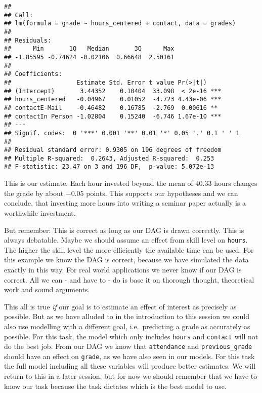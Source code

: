 \documentclass[
]{book}
\begin{document}
\begin{verbatim}
## 
## Call:
## lm(formula = grade ~ hours_centered + contact, data = grades)
## 
## Residuals:
##      Min       1Q   Median       3Q      Max 
## -1.85595 -0.74624 -0.02106  0.66648  2.50161 
## 
## Coefficients:
##                  Estimate Std. Error t value Pr(>|t|)    
## (Intercept)       3.44352    0.10404  33.098  < 2e-16 ***
## hours_centered   -0.04967    0.01052  -4.723 4.43e-06 ***
## contactE-Mail    -0.46482    0.16785  -2.769  0.00616 ** 
## contactIn Person -1.02804    0.15240  -6.746 1.67e-10 ***
## ---
## Signif. codes:  0 '***' 0.001 '**' 0.01 '*' 0.05 '.' 0.1 ' ' 1
## 
## Residual standard error: 0.9305 on 196 degrees of freedom
## Multiple R-squared:  0.2643, Adjusted R-squared:  0.253 
## F-statistic: 23.47 on 3 and 196 DF,  p-value: 5.072e-13
\end{verbatim}

This is our estimate. Each hour invested beyond the mean of \(40.33\) hours
changes the grade by about \(-0.05\) points. This supports our hypotheses and we
can conclude, that investing more hours into writing a seminar paper actually
is a worthwhile investment.

But remember: This is correct as long as our DAG is drawn correctly. This is
always debatable. Maybe we should assume an effect from skill level on \texttt{hours}.
The higher the skill level the more efficiently the available time can be used.
For this example we know the DAG is correct, because we have simulated the data
exactly in this way. For real world applications we never know if our DAG is
correct. All we can - and have to - do is base it on thorough thought,
theoretical work and sound arguments.

This all is true \emph{if} our goal is to estimate an effect of interest as precisely
as possible. But as we have alluded to in the introduction to this session we
could also use modelling with a different goal, i.e.~predicting a grade as
accurately as possible. For this task, the model which only includes \texttt{hours} and
\texttt{contact} will not do the best job. From our DAG we know that \texttt{attendance} and
\texttt{previous\_grade} should have an effect on \texttt{grade}, as we have also seen in our
models. For this task the full model including all these variables will produce
better estimates. We will return to this in a later session, but for now we
should remember that we have to know our task because the task dictates which is
the best model to use.
\end{document}
